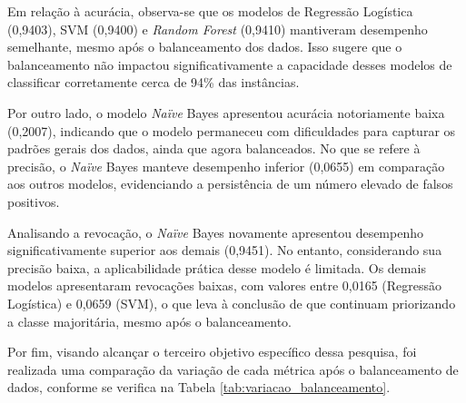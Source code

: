 \documentclass[conference]{IEEEtran}
\begin{document}
Em relação à acurácia, observa-se que os modelos de Regressão Logística (0,9403), SVM (0,9400) e \textit{Random Forest} (0,9410) mantiveram desempenho semelhante, mesmo após o balanceamento dos dados. Isso sugere que o balanceamento não impactou significativamente a capacidade desses modelos de classificar corretamente cerca de 94\% das instâncias.

Por outro lado, o modelo \textit{Naïve} Bayes apresentou acurácia notoriamente baixa (0,2007), indicando que o modelo permaneceu com dificuldades para capturar os padrões gerais dos dados, ainda que agora balanceados. No que se refere à precisão, o \textit{Naïve} Bayes manteve desempenho inferior (0,0655) em comparação aos outros modelos, evidenciando a persistência de um número elevado de falsos positivos.  

Analisando a revocação, o \textit{Naïve} Bayes novamente apresentou desempenho significativamente superior aos demais (0,9451). No entanto, considerando sua precisão baixa, a aplicabilidade prática desse modelo é limitada. Os demais modelos apresentaram revocações baixas, com valores entre 0,0165 (Regressão Logística) e 0,0659 (SVM), o que leva à conclusão de que continuam priorizando a classe majoritária, mesmo após o balanceamento. 

Por fim, visando alcançar o terceiro objetivo específico dessa pesquisa, foi realizada uma comparação da variação de cada métrica após o balanceamento de dados, conforme se verifica na Tabela \ref{tab:variacao_balanceamento}.
\end{document}
